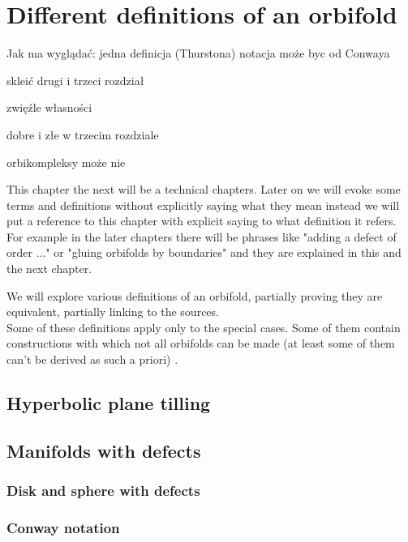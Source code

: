 \chapter{Different definitions of an orbifold}

Jak ma wyglądać:
jedna definicja (Thurstona)
notacja może byc od Conwaya

skleić drugi i trzeci rozdział

zwięźle własności


dobre i złe w trzecim rozdziale 

orbikompleksy może nie


This chapter the next will be a technical chapters. Later on we will evoke some terms and 
definitions without 
explicitly saying what they mean instead we will put a reference to this chapter with explicit 
saying to what definition it refers. \\
For example in the later chapters there will be phrases like "adding a defect of order $\dots$" or 
"gluing orbifolds by boundaries" and they are explained in this and the next chapter.
 

We will explore various definitions of an orbifold, partially proving they are equivalent, partially 
linking to the sources. \\
Some of these definitions apply only to the special cases. Some of them contain constructions 
with which not all orbifolds can be made (at least some of them can't be derived as such a priori)
. \\

\section{Hyperbolic plane tilling}

\section{Manifolds with defects}
\subsection{Disk and sphere with defects}\label{Disk_and_sphere_with_defects}



\subsection{Conway notation}
\cite{Conway2008}

